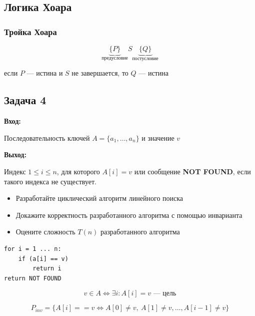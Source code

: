 \subsection{Логика Хоара}

\subsubsection{Тройка Хоара}

\[
    \underbrace{\{P\}}_{\text{предусловие}} S \underbrace{\{Q\}}_{\text{постусловие}}
\]

если $P$ --- истина и $S$ не завершается, то $Q$ --- истина

\subsection{Задача 4}

\begin{exercise}

\textbf{Вход:}

Последовательность ключей $A = \{a_1, \ldots, a_n\}$ и значение $v$

\textbf{Выход:}

Индекс $1 \leq i \leq n$, для которого $A[i] = v$ или сообщение \textbf{NOT FOUND}, если такого индекса не существует. 

\begin{itemize}
    \item Разработайте циклический алгоритм линейного поиска
    \item Докажите корректность разработанного алгоритма с помощью инварианта
    \item Оцените сложность $T(n)$ разработанного алгоритма
\end{itemize}
\end{exercise}

\begin{solution}
\begin{lstlisting}
for i = 1 ... n:
    if (a[i] == v)
        return i 
return NOT FOUND
\end{lstlisting}

\begin{theorem}[Утверждение]
\[
    \boxed{v \in A \Leftrightarrow \exists i : A[i] = v} \text{ --- цель}
\]
\end{theorem}

\[
    P_{inv} = \{A[i] = = v \Leftrightarrow A[0] \neq v,\ A[1] \neq v, \ldots, A[i-1] \neq v\} 
\]
\end{solution}

